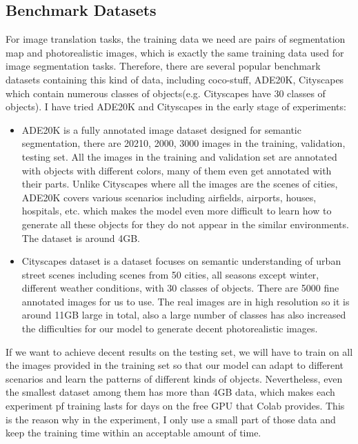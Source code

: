 \subsection{Benchmark Datasets}
For image translation tasks, the training data we need are pairs of segmentation map and 
photorealistic images, which is exactly the same training data used for image segmentation 
tasks. Therefore, there are several popular benchmark datasets containing this kind of data, 
including coco-stuff\cite{caesar2018cvpr}, ADE20K\cite{zhou2017scene}, 
Cityscapes\cite{Cordts2016Cityscapes} which contain numerous 
classes of objects(e.g. Cityscapes have 30 classes of objects).
I have tried ADE20K and Cityscapes in the early stage of experiments:
\begin{itemize}
    \item ADE20K is a fully annotated image dataset designed for semantic segmentation, 
    there are 20210, 2000, 3000 images in the training, validation, testing set. All the 
    images in the training and validation set are annotated with objects with different 
    colors, many of them even get annotated with their parts. Unlike Cityscapes where 
    all the images are the scenes of cities, ADE20K covers various scenarios including 
    airfields, airports, houses, hospitals, etc. which makes the model even more 
    difficult to learn how to generate all these objects for they do not appear in the 
    similar environments. The dataset is around 4GB.
    \item Cityscapes dataset is a dataset focuses on semantic understanding of urban street 
    scenes including scenes from 50 cities, all seasons except winter, different 
    weather conditions, with 30 classes of objects. There are 5000 fine annotated 
    images for us to use. The real images are in high resolution so it is around 11GB
    large in total, also a large number of classes has also increased the difficulties 
    for our model to generate decent photorealistic images. 
\end{itemize}
If we want to achieve decent results on the testing set, we will 
have to train on all the images provided in the training set so that our model can adapt 
to different scenarios and learn the patterns of different kinds of objects. Nevertheless, 
even the smallest dataset among them has more than 4GB data, which makes each experiment 
pf training lasts for days on the free GPU that Colab provides. This is the reason why 
in the experiment, I only use a small part of those data and keep the training time 
within an acceptable amount of time. 
